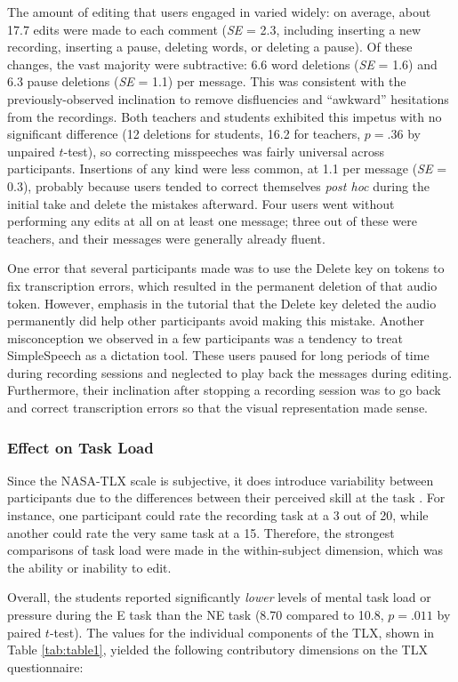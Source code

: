 The amount of editing that users engaged in varied widely: on average, about 17.7 edits were made to each comment (\textit{SE} = 2.3, including inserting a new recording, inserting a pause, deleting words, or deleting a pause). 
Of these changes, the vast majority were subtractive: 6.6 word deletions (\textit{SE} = 1.6) and 6.3 pause deletions (\textit{SE} = 1.1) per message.
This was consistent with the previously-observed inclination to remove disfluencies and ``awkward'' hesitations from the recordings.
Both teachers and students exhibited this impetus with no significant difference (12 deletions for students, 16.2 for teachers, $p=.36$ by unpaired $t$-test), so correcting misspeeches was fairly universal across participants.
Insertions of any kind were less common, at 1.1 per message (\textit{SE} = 0.3), probably because users tended to correct themselves \emph{post hoc} during the initial take and delete the mistakes afterward.
Four users went without performing any edits at all on at least one message; three out of these were teachers, and their messages were generally already fluent.

One error that several participants made was to use the Delete key on tokens to fix transcription errors, which resulted in the permanent deletion of that audio token. 
However, emphasis in the tutorial that the Delete key deleted the audio permanently did help other participants avoid making this mistake.
Another misconception we observed in a few participants was a tendency to treat SimpleSpeech as a dictation tool. 
These users paused for long periods of time during recording sessions and neglected to play back the messages during editing. 
Furthermore, their inclination after stopping a recording session was to go back and correct transcription errors so that the visual representation made sense.

\subsubsection{Effect on Task Load}
Since the NASA-TLX scale is subjective, it does introduce variability between participants due to the differences between their perceived skill at the task \cite{nasatlx}. 
For instance, one participant could rate the recording task at a 3 out of 20, while another could rate the very same task at a 15.
Therefore, the strongest comparisons of task load were made in the within-subject dimension, which was the ability or inability to edit.

Overall, the students reported significantly \emph{lower} levels of mental task load or pressure during the E task than the NE task (8.70 compared to 10.8, $p=.011$ by paired $t$-test). 
The values for the individual components of the TLX, shown in Table \ref{tab:table1}, yielded the following contributory dimensions on the TLX questionnaire:

